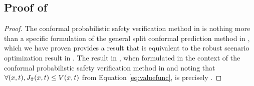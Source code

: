 \subsection{Proof of \texorpdfstring{}{Conformal Probabilistic Safety Verification Lemma}}\label{apd:conformal_lemma_proof}

\begin{proof}
    The conformal probabilistic safety verification method in  is nothing more than a specific formulation of the general split conformal prediction method in , which we have proven provides a result that is equivalent to the robust scenario optimization result in .
    The result in , when formulated in the context of the conformal probabilistic safety verification method in  and noting that $\forall (x,t), J_{\Tilde{\pi}}(x,t) \le V(x, t)$ from Equation \eqref{eq:valuefunc}, is precisely .
\end{proof}
